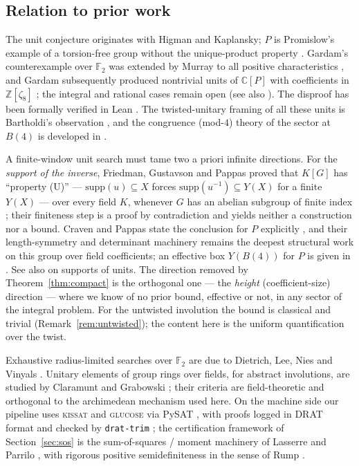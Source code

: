 \documentclass[10pt,a4paper]{amsart}
\newcommand{\ZZ}{\mathbb{Z}}
\newcommand{\supp}{\mathrm{supp}}
\begin{document}
\subsection*{Relation to prior work}

The unit conjecture originates with Higman \cite{Higman1940} and
Kaplansky; $P$ is Promislow's example of a torsion-free group without
the unique-product property \cite{Promislow1988}.  Gardam's
counterexample over $\mathbb{F}_2$ \cite{Gardam} was extended by
Murray to all positive characteristics \cite{Murray2021}, and Gardam
subsequently produced nontrivial units of $\mathbb{C}[P]$ with
coefficients in $\ZZ[\zeta_8]$ \cite{GardamComplex2023}; the integral
and rational cases remain open (see also \cite{Passman2021}).  The
disproof has been formally verified in Lean
\cite{GadgilTadipatri2024}.  The twisted-unitary framing of all these
units is Bartholdi's observation \cite{Bartholdi2022}, and the
congruence (mod-$4$) theory of the sector at $B(4)$ is developed in
\cite{paper5}.

A finite-window unit search must tame two a priori infinite
directions.  For the \emph{support of the inverse}, Friedman,
Gustavson and Pappas proved that $K[G]$ has ``property (U)'' ---
$\supp(u)\subseteq X$ forces $\supp(u^{-1})\subseteq Y(X)$ for a
finite $Y(X)$ --- over every field $K$, whenever $G$ has an abelian
subgroup of finite index \cite[Thm.~2.3]{FGP1995}; their finiteness
step is a proof by contradiction and yields neither a construction nor
a bound.  Craven and Pappas state the conclusion for $P$ explicitly
\cite[Thm.~14.3]{CravenPappas2013}, and their length-symmetry and
determinant machinery remains the deepest structural work on this
group over field coefficients; an effective box $Y(B(4))$ for $P$ is
given in \cite{paper6}.  See also \cite{Pappas1988} on supports of
units.  The direction removed by Theorem~\ref{thm:compact} is the
orthogonal one --- the \emph{height} (coefficient-size) direction ---
where we know of no prior bound, effective or not, in any sector of
the integral problem.  For the untwisted involution the bound is
classical and trivial (Remark~\ref{rem:untwisted}); the content here
is the uniform quantification over the twist.

Exhaustive radius-limited searches over $\mathbb{F}_2$ are due to
Dietrich, Lee, Nies and Vinyals \cite{DLNV2026}.  Unitary elements of
group rings over fields, for abstract involutions, are studied by
Claramunt and Grabowski \cite{ClaramuntGrabowski2023}; their criteria
are field-theoretic and orthogonal to the archimedean mechanism used
here.  On the machine side our pipeline uses \textsc{kissat}
\cite{kissat} and \textsc{glucose} \cite{glucose} via PySAT
\cite{pysat}, with proofs logged in DRAT format and checked by
\texttt{drat-trim} \cite{DRATtrim}; the certification framework of
Section~\ref{sec:sos} is the sum-of-squares / moment machinery of
Lasserre and Parrilo \cite{Lasserre2001,Parrilo2003}, with rigorous
positive semidefiniteness in the sense of Rump \cite{Rump2006}.
\end{document}
